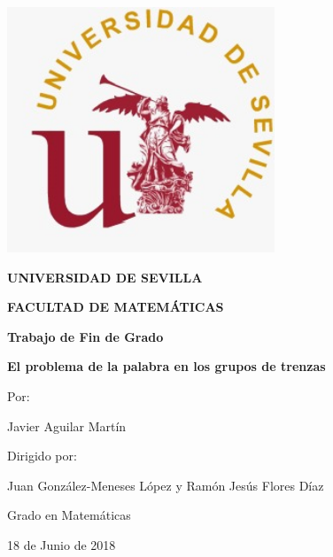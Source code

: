 \documentclass[twoside,12pt]{report}
\begin{document}
\begin{titlepage}
	\centering
		\includegraphics[width=8cm]{Imagenes/sello.jpeg}
		
	{\Large\bfseries UNIVERSIDAD DE SEVILLA\par}
	{\Large\bfseries FACULTAD DE MATEMÁTICAS\par}
	\vspace{0.5cm}
	{\large\bfseries Trabajo de Fin de Grado \par}
	\vspace{1cm}
	{\Huge\bfseries El problema de la palabra en los grupos de trenzas\par}
	\vspace{1cm}
	{\large Por:\par}
	{\large Javier Aguilar Martín\par}
	\vspace{0.5cm}
	{\large Dirigido por:\par}
	{\large Juan González-Meneses López y Ramón Jesús Flores Díaz\par}
	\vspace{1cm}
	{\large Grado en Matemáticas\par}
	\vspace{0.5cm}
	{\large 18 de Junio de 2018\par}
	\vspace{1cm}





	
\end{titlepage}



\tableofcontents










\end{document}
